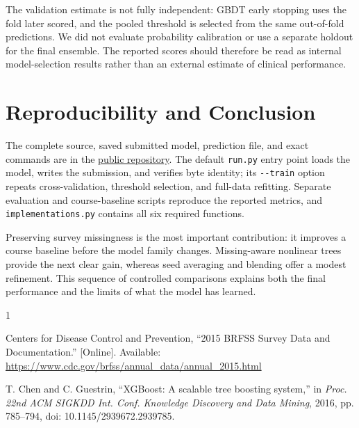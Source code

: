 \documentclass[10pt,conference,compsocconf]{IEEEtran}
\newcommand{\code}[1]{\texttt{#1}}
\begin{document}
The validation estimate is not fully independent: GBDT early stopping uses
the fold later scored, and the pooled threshold is selected from the same
out-of-fold predictions. We did not evaluate probability calibration or use a
separate holdout for the final ensemble. The reported scores should therefore
be read as internal model-selection results rather than an external estimate
of clinical performance.

\section{Reproducibility and Conclusion}

The complete source, saved submitted model, prediction file, and exact
commands are in the \href{https://github.com/neilc720/ml-project-1}{public
repository}. The default \code{run.py} entry point loads the model, writes the
submission, and verifies byte identity; its \code{-{}-train} option repeats
cross-validation, threshold selection, and full-data refitting. Separate
evaluation and course-baseline scripts reproduce the reported metrics, and
\code{implementations.py} contains all six required functions.

Preserving survey missingness is the most important contribution: it improves
a course baseline before the model family changes. Missing-aware nonlinear
trees provide the next clear gain, whereas seed averaging and blending offer a
modest refinement. This sequence of controlled comparisons explains both the
final performance and the limits of what the model has learned.

\begin{thebibliography}{1}

Centers for Disease Control and Prevention, ``2015 BRFSS Survey Data and
Documentation.'' [Online]. Available:
\url{https://www.cdc.gov/brfss/annual_data/annual_2015.html}

T. Chen and C. Guestrin, ``XGBoost: A scalable tree boosting system,'' in
\textit{Proc. 22nd ACM SIGKDD Int. Conf. Knowledge Discovery and Data Mining},
2016, pp. 785--794, doi: 10.1145/2939672.2939785.

\end{thebibliography}
\end{document}
